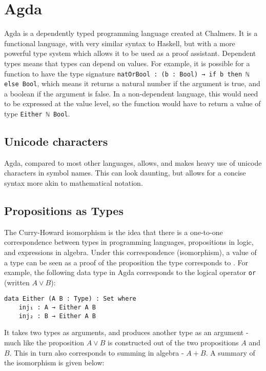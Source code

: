 \section{Agda}
Agda is a dependently typed programming language \cite{agdaWebsite} created at Chalmers. It is a functional language, with very similar syntax to Haskell, but with a more powerful type system which allows it to be used as a proof assistant. Dependent types means that types can depend on values. For example, it is possible for a function to have the type signature \texttt{natOrBool : (b : Bool) → if b then ℕ else Bool}, which means it returns a natural number if the argument is true, and a boolean if the argument is false. In a non-dependent language, this would need to be expressed at the value level, so the function would have to return a value of type \texttt{Either ℕ Bool}.

\subsection{Unicode characters}
Agda, compared to most other languages, allows, and makes heavy use of unicode characters in symbol names. This can look daunting, but allows for a concise syntax more akin to mathematical notation. 

\subsection{Propositions as Types}
The Curry-Howard isomorphism \cite{propositionastypes} is the idea that there is a one-to-one correspondence between types in programming languages, propositions in logic, and expressions in algebra. Under this correspondence (isomorphism), a value of a type can be seen as a proof of the proposition the type corresponds to \cite{DependentTypesAtWork}. For example, the following data type in Agda corresponds to the logical operator \texttt{or} (written $A \vee B$):

\begin{verbatim}
data Either (A B : Type) : Set where
    inj₁ : A → Either A B
    inj₂ : B → Either A B
\end{verbatim}

It takes two types as arguments, and produces another type as an argument - much like the proposition $A \vee B$ is constructed out of the two propositions $A$ and $B$. This in turn also corresponds to summing in algebra - $A + B$. A summary of the isomorphism is given below:

